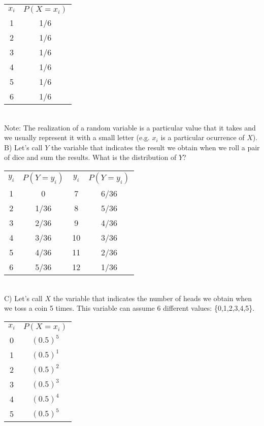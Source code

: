 \documentclass[11pt]{article}
\begin{document}
	\begin{tabular}{|c|c|}
\hline
	$x_i$ & $P(X=x_i)$\\
	\cline{1-2}
	1 & 1/6\\
	2 & 1/6\\
	3 & 1/6\\
	4 & 1/6\\
	5 & 1/6\\
	6 & 1/6\\

\hline
\end{tabular}\newline\\

Note: The realization of a random variable is a particular value that it takes and we usually represent it with a small letter (e.g. $x_i$ is a particular ocurrence of $X$).\\

	B) Let's call $Y$ the variable that indicates the result we obtain when we roll a pair of dice and sum the results. What is the distribution of $Y$?\\
	
	\begin{tabular}{|c|c|c|c|}
\hline
	$y_i$ & $P(Y=y_i)$ & $y_i$ & $P(Y=y_i)$\\
	\cline{1-4}
	1 & 0 & 7 & 6/36\\
	2 & 1/36 & 8 & 5/36\\
	3 & 2/36 & 9 & 4/36\\
	4 & 3/36 & 10 & 3/36\\
	5 & 4/36 & 11 & 2/36\\
	6 & 5/36 & 12 & 1/36\\
\hline
\end{tabular}\newline\\

	C) Let's call $X$ the variable that indicates the number of heads we obtain when we toss a coin 5 times. This variable can assume 6 different values: \{0,1,2,3,4,5\}.\\
	
	\begin{tabular}{|c|c|}
\hline
	$x_i$ & $P(X=x_i)$\\
	\cline{1-2}
	0 & $(0.5)^5$\\
	1 & $(0.5)^1$\\
	2 & $(0.5)^2$\\
	3 & $(0.5)^3$\\
	4 & $(0.5)^4$\\
	5 & $(0.5)^5$\\
\hline
\end{tabular}
\end{document}
